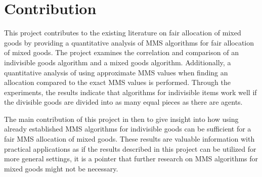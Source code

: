 \chapter{Contribution}\label{chp:contribution}


This project contributes to the existing literature on fair allocation of mixed goods by providing a quantitative analysis of MMS algorithms for fair allocation of mixed goods. The project examines the correlation and comparison of an indivisible goods algorithm and a mixed goods algorithm. Additionally, a quantitative analysis of using approximate MMS values when finding an allocation compared to the exact MMS values is performed. Through the experiments, the results indicate that algorithms for indivisible items work well if the divisible goods are divided into as many equal pieces as there are agents.

The main contribution of this project in then to give insight into how using already established MMS algorithms for indivisible goods can be sufficient for a fair MMS allocation of mixed goods. These results are valuable information with practical applications as if the results described in this project can be utilized for more general settings, it is a pointer that further research on MMS algorithms for mixed goods might not be necessary.